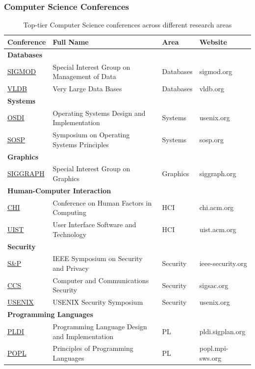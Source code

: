 \documentclass[11pt,a4paper]{article}
\begin{document}
\subsubsection{Computer Science Conferences}

\begin{table}[H]
\centering
\small
\begin{tabular}{@{}llll@{}}
\toprule
\textbf{Conference} & \textbf{Full Name} & \textbf{Area} & \textbf{Website} \\
\midrule
\multicolumn{4}{l}{\textbf{Databases}} \\
\href{https://sigmod.org/}{SIGMOD} & Special Interest Group on Management of Data & Databases & sigmod.org \\
\href{https://vldb.org/}{VLDB} & Very Large Data Bases & Databases & vldb.org \\
\midrule
\multicolumn{4}{l}{\textbf{Systems}} \\
\href{https://www.usenix.org/conference/osdi24}{OSDI} & Operating Systems Design and Implementation & Systems & usenix.org \\
\href{https://sosp.org/}{SOSP} & Symposium on Operating Systems Principles & Systems & sosp.org \\
\midrule
\multicolumn{4}{l}{\textbf{Graphics}} \\
\href{https://siggraph.org/}{SIGGRAPH} & Special Interest Group on Graphics & Graphics & siggraph.org \\
\midrule
\multicolumn{4}{l}{\textbf{Human-Computer Interaction}} \\
\href{https://chi2024.acm.org/}{CHI} & Conference on Human Factors in Computing & HCI & chi.acm.org \\
\href{https://uist.acm.org/}{UIST} & User Interface Software and Technology & HCI & uist.acm.org \\
\midrule
\multicolumn{4}{l}{\textbf{Security}} \\
\href{https://www.ieee-security.org/TC/SP2024/}{S\&P} & IEEE Symposium on Security and Privacy & Security & ieee-security.org \\
\href{https://www.sigsac.org/ccs/}{CCS} & Computer and Communications Security & Security & sigsac.org \\
\href{https://www.usenix.org/conference/usenixsecurity24}{USENIX} & USENIX Security Symposium & Security & usenix.org \\
\midrule
\multicolumn{4}{l}{\textbf{Programming Languages}} \\
\href{https://pldi.sigplan.org/}{PLDI} & Programming Language Design and Implementation & PL & pldi.sigplan.org \\
\href{https://popl.mpi-sws.org/}{POPL} & Principles of Programming Languages & PL & popl.mpi-sws.org \\
\bottomrule
\end{tabular}
\caption{Top-tier Computer Science conferences across different research areas}
\end{table}
\end{document}
